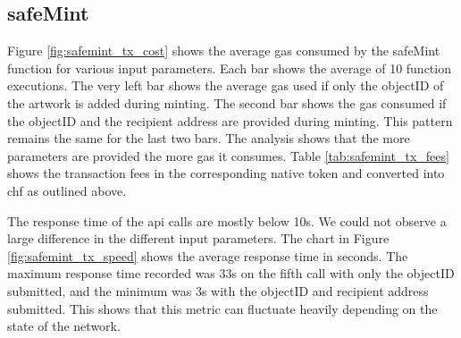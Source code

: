 \subsection*{safeMint}
Figure \ref{fig:safemint_tx_cost} shows the average gas consumed by the safeMint function for various input parameters. Each bar shows the average of 10 function executions. The very left bar shows the average gas used if only the objectID of the artwork is added during minting. The second bar shows the gas consumed if the objectID and the recipient address are provided during minting. This pattern remains the same for the last two bars. The analysis shows that the more parameters are provided the more gas it consumes. Table \ref{tab:safemint_tx_fees} shows the transaction fees in the corresponding native token and converted into \gls{chf} as outlined above. 

\begin{table}[h]
\caption{Estimated transaction fees safeMint}
\label{tab:safemint_tx_fees}
\end{table}

The response time of the \gls{api} calls are mostly below 10s. We could not observe a large difference in the different input parameters. The chart in Figure \ref{fig:safemint_tx_speed} shows the average response time in seconds. The maximum response time recorded was 33s on the fifth call with only the objectID submitted, and the minimum was 3s with the objectID and recipient address submitted. This shows that this metric can fluctuate heavily depending on the state of the network.


